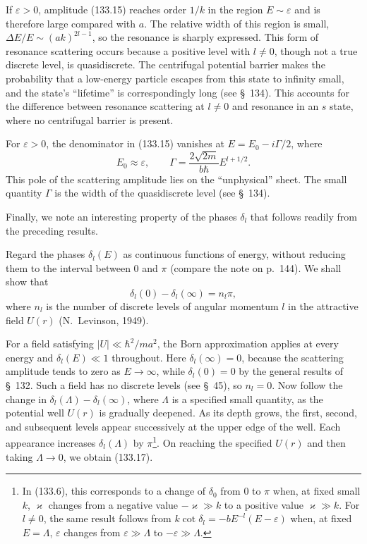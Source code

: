 If $\varepsilon>0$, amplitude (133.15) reaches order $1/k$ in the region $E\sim\varepsilon$ and is therefore large compared with $a$. The relative width of this region is small, $\Delta E/E\sim(ak)^{2l-1}$, so the resonance is sharply expressed. This form of resonance scattering occurs because a positive level with $l\ne0$, though not a true discrete level, is quasidiscrete. The centrifugal potential barrier makes the probability that a low-energy particle escapes from this state to infinity small, and the state's ``lifetime'' is correspondingly long (see \S~134). This accounts for the difference between resonance scattering at $l\ne0$ and resonance in an $s$ state, where no centrifugal barrier is present.

For $\varepsilon>0$, the denominator in (133.15) vanishes at $E=E_0-i\Gamma/2$, where
\begin{equation}
 E_0\approx\varepsilon,\qquad \Gamma=\frac{2\sqrt{2m}}{b\hbar}E^{l+1/2}.
 \tag{133.16}
\end{equation}
This pole of the scattering amplitude lies on the ``unphysical'' sheet. The small quantity $\Gamma$ is the width of the quasidiscrete level (see \S~134).

Finally, we note an interesting property of the phases $\delta_l$ that follows readily from the preceding results.

Regard the phases $\delta_l(E)$ as continuous functions of energy, without reducing them to the interval between 0 and $\pi$ (compare the note on p.~144). We shall show that
\begin{equation}
 \delta_l(0)-\delta_l(\infty)=n_l\pi,
 \tag{133.17}
\end{equation}
where $n_l$ is the number of discrete levels of angular momentum $l$ in the attractive field $U(r)$ (N.~Levinson, 1949).

For a field satisfying $|U|\ll\hbar^2/ma^2$, the Born approximation applies at every energy and $\delta_l(E)\ll1$ throughout. Here $\delta_l(\infty)=0$, because the scattering amplitude tends to zero as $E\to\infty$, while $\delta_l(0)=0$ by the general results of \S~132. Such a field has no discrete levels (see \S~45), so $n_l=0$. Now follow the change in $\delta_l(\Lambda)-\delta_l(\infty)$, where $\Lambda$ is a specified small quantity, as the potential well $U(r)$ is gradually deepened. As its depth grows, the first, second, and subsequent levels appear successively at the upper edge of the well. Each appearance increases $\delta_l(\Lambda)$ by $\pi$\footnote{In (133.6), this corresponds to a change of $\delta_0$ from 0 to $\pi$ when, at fixed small $k$, $\varkappa$ changes from a negative value $-\varkappa\gg k$ to a positive value $\varkappa\gg k$. For $l\ne0$, the same result follows from $k\cot\delta_l=-bE^{-l}(E-\varepsilon)$ when, at fixed $E=\Lambda$, $\varepsilon$ changes from $\varepsilon\gg\Lambda$ to $-\varepsilon\gg\Lambda$.}. On reaching the specified $U(r)$ and then taking $\Lambda\to0$, we obtain (133.17).

